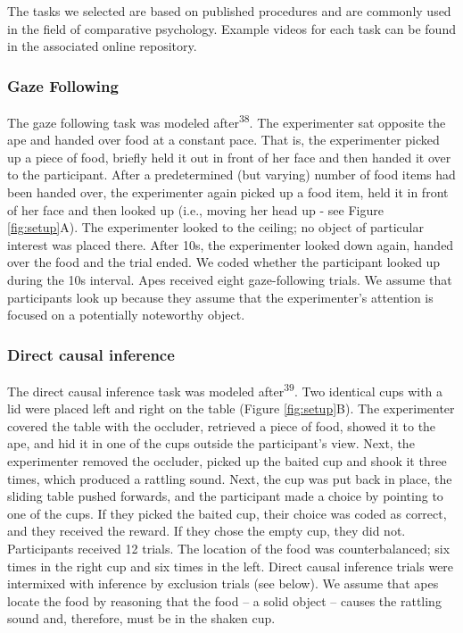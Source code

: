 \documentclass[
  man,floatsintext]{apa6}
\begin{document}
The tasks we selected are based on published procedures and are commonly used in the field of comparative psychology. Example videos for each task can be found in the associated online repository.

\hypertarget{gaze-following}{%
\subsubsection{Gaze Following}\label{gaze-following}}

The gaze following task was modeled after\textsuperscript{38}. The experimenter sat opposite the ape and handed over food at a constant pace. That is, the experimenter picked up a piece of food, briefly held it out in front of her face and then handed it over to the participant. After a predetermined (but varying) number of food items had been handed over, the experimenter again picked up a food item, held it in front of her face and then looked up (i.e., moving her head up - see Figure \ref{fig:setup}A). The experimenter looked to the ceiling; no object of particular interest was placed there. After 10s, the experimenter looked down again, handed over the food and the trial ended. We coded whether the participant looked up during the 10s interval. Apes received eight gaze-following trials. We assume that participants look up because they assume that the experimenter's attention is focused on a potentially noteworthy object.

\hypertarget{direct-causal-inference}{%
\subsubsection{Direct causal inference}\label{direct-causal-inference}}

The direct causal inference task was modeled after\textsuperscript{39}. Two identical cups with a lid were placed left and right on the table (Figure \ref{fig:setup}B). The experimenter covered the table with the occluder, retrieved a piece of food, showed it to the ape, and hid it in one of the cups outside the participant's view. Next, the experimenter removed the occluder, picked up the baited cup and shook it three times, which produced a rattling sound. Next, the cup was put back in place, the sliding table pushed forwards, and the participant made a choice by pointing to one of the cups. If they picked the baited cup, their choice was coded as correct, and they received the reward. If they chose the empty cup, they did not. Participants received 12 trials. The location of the food was counterbalanced; six times in the right cup and six times in the left. Direct causal inference trials were intermixed with inference by exclusion trials (see below). We assume that apes locate the food by reasoning that the food -- a solid object -- causes the rattling sound and, therefore, must be in the shaken cup.
\end{document}
